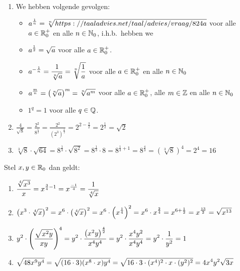 \documentclass{ximera}
\begin{document}
\begin{example} \ 
	
	\begin{enumerate}
	\item  We hebben volgende gevolgen:
	\begin{itemize}
		\item $\displaystyle a^{\frac{1}{n}}=\sqrt[n]{https://taaladvies.net/taal/advies/vraag/824a}$ voor alle $a\in\mathbb{R}_0^+$ en alle
		$n\in\mathbb{N}_0$, i.h.b.~hebben we
		\item $\displaystyle a^{\frac{1}{2}}=\sqrt{a}$ voor alle $a\in\mathbb{R}_0^+$.
		\item $\displaystyle a^{-\frac{1}{n}}=\frac{1}{\sqrt[n]{a}}=\sqrt[n]{\frac{1}{a}}$ voor alle $a\in\mathbb{R}_0^+$ en alle $n\in\mathbb{N}_0$
		\item $\displaystyle a^{\frac{m}{n}}=\left(\sqrt[n]{a}\right)^m=\sqrt[n]{a^m}$ voor alle $a\in\mathbb{R}_0^+$, alle $m\in\mathbb{Z}$ en alle $n\in\mathbb{N}_0$
		\item $1^q=1$ voor alle $q\in\mathbb{Q}$.
	\end{itemize}

	\item $\frac{4}{\sqrt{8}}=\frac{2^{2}}{8^{\frac{1}{2}}}=\frac{2^{2}}{(2^{3})^{\frac{1}{2}}}=2^{2-\frac{3}{2}}=
	2^{\frac{1}{2}}=\sqrt{2}$
	\item
$\sqrt[3]{8} \cdot \sqrt{64}=8^{\frac{1}{3}}\cdot \sqrt{8^{2}}=8^{\frac{1}{3}}\cdot8=8^{\frac{1}{3}+1}=8^{\frac{4}{3}}=(\sqrt[3]{8})^4=2^4=16$
\end{enumerate}
	Stel $x,y \in \mathbb{R}_0$ dan geldt:
\begin{enumerate}[resume]
	\item
	$\displaystyle{\frac{\sqrt[4]{x^{3}}}{x}=x^{\frac{3}{4}-1}=x^{\frac{-1}{4}}=\frac{1}{\sqrt[4]{x}}}$
	\item
	$\displaystyle{\left(x^{3}\cdot \sqrt[4]{x}\right)^{2}=x^{6}\cdot \left(\sqrt[4]{x}\right)^{2}=x^{6}\cdot \left(x^{\frac{1}{4}}\right)^{2}=x^{6}\cdot x^{\frac{2}{4}}=
		x^{6+\frac{1}{2}}=x^{\frac{13}{2}}=\sqrt{x^{13}}}$
	\item
	$\displaystyle{y^{2} \cdot \left(\frac{\sqrt{x^{2}y}}{xy}\right)^{4}=y^{2} \cdot \frac{\left(x^{2}y\right)^{\frac{4}{2}}}{x^{4}y^{4}}=y^{2}\cdot \frac{x^{4}y^{2}}{x^{4}y^{4}}
		=y^{2} \cdot \frac{1}{y^{2}}=1}$
	\item
	$\displaystyle{\sqrt{48 x^{9}y^{4}}=\sqrt{(16 \cdot 3)(x^{8} \cdot
			x)y^{4}}=\sqrt{16 \cdot 3\cdot (x^{4})^{2}\cdot x\cdot
			(y^{2})^{2}}=4 x^{4}y^{2}\sqrt{3x}}$
	
\end{enumerate}
\end{example}
\end{document}
